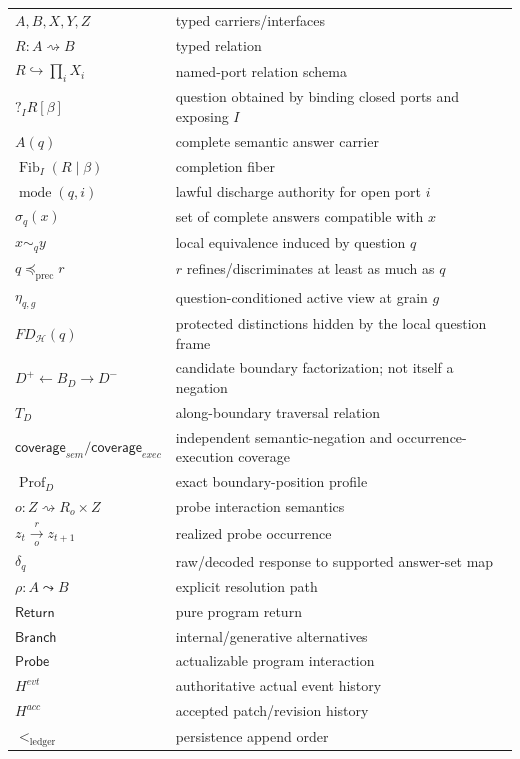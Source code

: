 \documentclass[11pt,oneside]{article}
\newcommand{\Fib}{\operatorname{Fib}}
\newcommand{\Prof}{\operatorname{Prof}}
\begin{document}
\begin{longtable}{p{}p{}}
\(A,B,X,Y,Z\) & typed carriers/interfaces\\
\(R:A\rightsquigarrow B\) & typed relation\\
\(R\hookrightarrow\prod_i X_i\) & named-port relation schema\\
\(?_I R[\beta]\) & question obtained by binding closed ports and exposing \(I\)\\
\(A(q)\) & complete semantic answer carrier\\
\(\Fib_I(R\mid\beta)\) & completion fiber\\
\(\operatorname{mode}(q,i)\) & lawful discharge authority for open port \(i\)\\
\(\sigma_q(x)\) & set of complete answers compatible with \(x\)\\
\(x\sim_q y\) & local equivalence induced by question \(q\)\\
\(q\preceq_{\mathrm{prec}}r\) & \(r\) refines/discriminates at least as much as \(q\)\\
\(\eta_{q,g}\) & question-conditioned active view at grain \(g\)\\
\(FD_{\mathcal H}(q)\) & protected distinctions hidden by the local question frame\\
\(D^+\leftarrow B_D\rightarrow D^-\) & candidate boundary factorization; not itself a negation\\
\(T_D\) & along-boundary traversal relation\\
\(\mathsf{coverage}_{sem}/\mathsf{coverage}_{exec}\) & independent semantic-negation and occurrence-execution coverage\\
\(\Prof_D\) & exact boundary-position profile\\
\(o:Z\rightsquigarrow R_o\times Z\) & probe interaction semantics\\
\(z_t\xrightarrow[o]{r}z_{t+1}\) & realized probe occurrence\\
\(\delta_q\) & raw/decoded response to supported answer-set map\\
\(\rho:A\leadsto B\) & explicit resolution path\\
\(\mathsf{Return}\) & pure program return\\
\(\mathsf{Branch}\) & internal/generative alternatives\\
\(\mathsf{Probe}\) & actualizable program interaction\\
\(H^{evt}\) & authoritative actual event history\\
\(H^{acc}\) & accepted patch/revision history\\
\(<_{\mathrm{ledger}}\) & persistence append order\\

\end{longtable}
\end{document}
